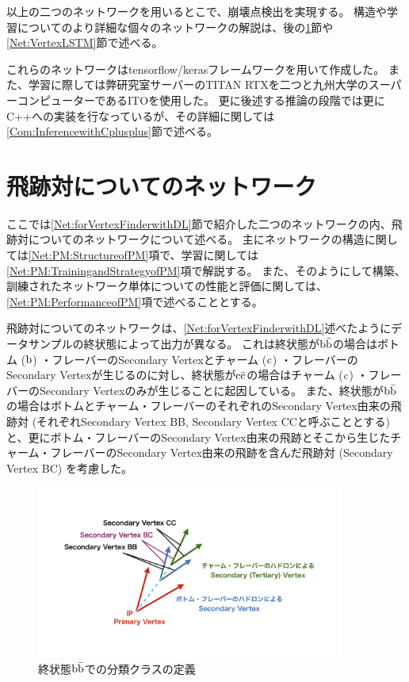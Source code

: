 以上の二つのネットワークを用いるとこで、崩壊点検出を実現する。
構造や学習についてのより詳細な個々のネットワークの解説は、後の\ref{Net:PairModel}節や\ref{Net:VertexLSTM}節で述べる。

これらのネットワークはtensorflow/kerasフレームワークを用いて作成した。
また、学習に際しては弊研究室サーバーのTITAN RTXを二つと九州大学のスーパーコンピューターであるITOを使用した。
更に後述する推論の段階では更にC++への実装を行なっているが、その詳細に関しては\ref{Com:InferencewithCplusplus}節で述べる。

\section{飛跡対についてのネットワーク} \label{Net:PairModel}

ここでは\ref{Net:forVertexFinderwithDL}節で紹介した二つのネットワークの内、飛跡対についてのネットワークについて述べる。
主にネットワークの構造に関しては\ref{Net:PM:StructureofPM}項で、学習に関しては\ref{Net:PM:TrainingandStrategyofPM}項で解説する。
また、そのようにして構築、訓練されたネットワーク単体についての性能と評価に関しては、\ref{Net:PM:PerformanceofPM}項で述べることとする。

飛跡対についてのネットワークは、\ref{Net:forVertexFinderwithDL}述べたようにデータサンプルの終状態によって出力が異なる。
これは終状態が$\rm b\bar{b}$の場合はボトム ($\rm b$) ・フレーバーのSecondary Vertexとチャーム ($\rm c$) ・フレーバーのSecondary Vertexが生じるのに対し、終状態が$\rm c\bar{c}$の場合はチャーム ($\rm c$) ・フレーバーのSecondary Vertexのみが生じることに起因している。
また、終状態が$\rm b\bar{b}$の場合はボトムとチャーム・フレーバーのそれぞれのSecondary Vertex由来の飛跡対 (それぞれSecondary Vertex BB, Secondary Vertex CCと呼ぶこととする) と、更にボトム・フレーバーのSecondary Vertex由来の飛跡とそこから生じたチャーム・フレーバーのSecondary Vertex由来の飛跡を含んだ飛跡対 (Secondary Vertex BC) を考慮した。

\begin{figure}[h]
 \centering
 \includegraphics[trim = 0 100 0 50, width=0.9\textwidth]{Figure/3Networks/3-3-0-1SecondaryVertexBC.png}
 \caption{終状態$\rm b\bar{b}$での分類クラスの定義}
 \label{3-3-0-1SecondaryVertexBC}
\end{figure}

